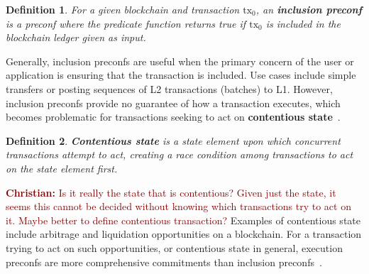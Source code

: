 \documentclass[a4paper]{article}
\theoremstyle{boldstyle}
\newtheorem{definitionx}{Definition}
\newenvironment{definition}
  {\begin{defopenboxq}\begin{definitionx}}
  {\end{definitionx}\end{defopenboxq}}
\newcommand{\ks}[1]{\textcolor{purple}{\textbf{Katerina:} #1}}
\newcommand{\chm}[1]{\textcolor{Maroon}{\textbf{Christian:} #1}}
\begin{document}
        \begin{definition}
        For a given blockchain and transaction $\mathrm{tx_0}$, an \textbf{inclusion preconf} is a preconf where the predicate function returns true if $\mathrm{tx_0}$ is included in the blockchain ledger given as input.
        \end{definition}        
        Generally, inclusion preconfs are useful when the primary concern of the user or application is ensuring that the transaction is included. Use cases include simple transfers or posting sequences of L2 transactions (batches) to L1.  
        However, inclusion preconfs provide no guarantee of how a transaction executes, which becomes problematic for transactions seeking to act on \textbf{contentious state}~\cite{W:AnalysingExpectedProposerRevenuefromPreconfirmations,W:APricingModelforInclusionPreconfirmations}. 
        \begin{definition}
        \label{def:contentious state}
        \textbf{Contentious state} is a state element upon which concurrent transactions attempt to act, creating a race condition among transactions to act on the state element first.
        \end{definition}
        \chm{Is it really the state that is contentious? Given just the state, it seems this cannot be decided without knowing which transactions try to act on it. Maybe better to define contentious transaction?}
        Examples of contentious state include arbitrage and liquidation opportunities on a blockchain. For a transaction trying to act on such opportunities, or contentious state in general, execution preconfs are more comprehensive commitments than inclusion preconfs~\cite{W:ATaxonomyofPreconfirmationGuaranteesandTheirSlashingConditionsinRollups}.
\end{document}
